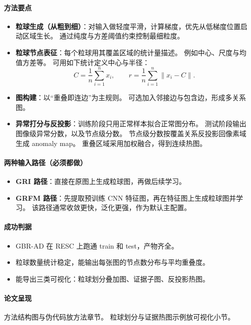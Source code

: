 \documentclass[UTF8,a4paper]{ctexart}
\begin{document}
\paragraph{方法要点}
\begin{itemize}
  \item \textbf{粒球生成（从粗到细）}：对输入做轻度平滑，计算梯度，优先从低梯度位置启动区域生长。
  通过纯度与方差阈值约束控制最细粒度。
  \item \textbf{粒球节点表征}：每个粒球用其覆盖区域的统计量描述。
  例如中心、尺度与均值方差等。
  可用如下统计定义中心与半径：
  \begin{equation}
    C=\frac{1}{n}\sum_{i=1}^{n}x_i,\qquad
    r=\frac{1}{n}\sum_{i=1}^{n}\lVert x_i-C\rVert .
  \end{equation}
  \item \textbf{图构建}：以“重叠即连边”为主规则。
  可选加入邻接边与包含边，形成多关系图。
  \item \textbf{异常打分与反投影}：训练阶段只用正常样本拟合正常图分布。
  测试阶段输出图像级异常分数，以及节点级分数。
  节点级分数按覆盖关系反投影回像素域生成 anomaly map。
  重叠区域采用加权融合，得到连续热图。
\end{itemize}

\paragraph{两种输入路径（必须都做）}
\begin{itemize}
  \item \textbf{GRI 路径}：直接在原图上生成粒球图，再做后续学习。
  \item \textbf{GRFM 路径}：先提取预训练 CNN 特征图，再在特征图上生成粒球图并学习。
  该路径通常收敛更快，泛化更强，作为默认主配置。
\end{itemize}

\paragraph{成功判据}
\begin{itemize}
  \item GBR-AD 在 RESC 上跑通 train 和 test，产物齐全。
  \item 粒球数量统计稳定，能输出每张图的节点数分布与平均重叠度。
  \item 能导出三类可视化：粒球划分叠加图、证据子图、反投影热图。
\end{itemize}

\paragraph{论文呈现}
方法结构图与伪代码放方法章节。
粒球划分与证据热图示例放可视化小节。
\end{document}
